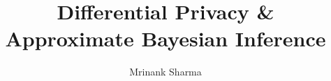 \title{Differential Privacy \& Approximate Bayesian Inference}


\author{Mrinank Sharma}








     



\renewcommand{\submissiontext}{ I hereby declare that, except where specifically indicated, the work submitted herin is my own original work. \vspace{2cm}\\ This report is submitted for the degree of}




\subject{LaTeX} 
